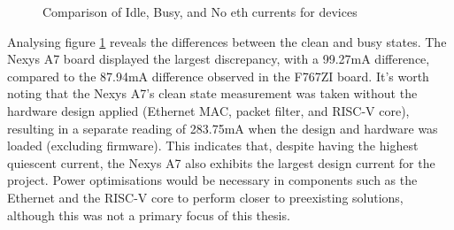 \begin{figure}[ht]
    \centering
    \caption{Comparison of Idle, Busy, and No eth currents for devices}
    \label{fig:power_comparison}
    \end{figure}
    


Analysing figure \ref{fig:power_comparison} reveals the differences between the clean and busy states. The Nexys A7 board displayed the largest discrepancy, with a 99.27mA difference, compared to the 87.94mA difference observed in the F767ZI board. It's worth noting that the Nexys A7's clean state measurement was taken without the hardware design applied (Ethernet MAC, packet filter, and RISC-V core), resulting in a separate reading of 283.75mA when the design and hardware was loaded (excluding firmware). This indicates that, despite having the highest quiescent current, the Nexys A7 also exhibits the largest design current for the project. Power optimisations would be necessary in components such as the Ethernet and the RISC-V core to perform closer to preexisting solutions, although this was not a primary focus of this thesis.

